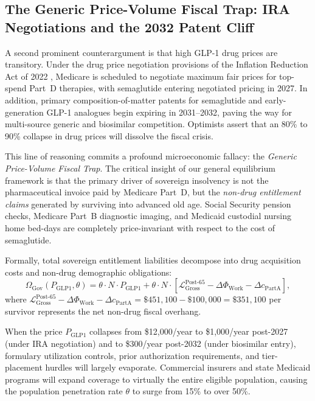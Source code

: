 \documentclass[11pt,a4paper]{article}
\begin{document}
\subsection{The Generic Price-Volume Fiscal Trap: IRA Negotiations and the 2032 Patent Cliff}
A second prominent counterargument is that high GLP-1 drug prices are transitory. Under the drug price negotiation provisions of the Inflation Reduction Act of 2022 \citep{frank2023ira}, Medicare is scheduled to negotiate maximum fair prices for top-spend Part~D therapies, with semaglutide entering negotiated pricing in 2027. In addition, primary composition-of-matter patents for semaglutide and early-generation GLP-1 analogues begin expiring in 2031--2032, paving the way for multi-source generic and biosimilar competition. Optimists assert that an 80\% to 90\% collapse in drug prices will dissolve the fiscal crisis.

This line of reasoning commits a profound microeconomic fallacy: the \textit{Generic Price-Volume Fiscal Trap}. The critical insight of our general equilibrium framework is that the primary driver of sovereign insolvency is not the pharmaceutical invoice paid by Medicare Part~D, but the \textit{non-drug entitlement claims} generated by surviving into advanced old age. Social Security pension checks, Medicare Part~B diagnostic imaging, and Medicaid custodial nursing home bed-days are completely price-invariant with respect to the cost of semaglutide. 

Formally, total sovereign entitlement liabilities decompose into drug acquisition costs and non-drug demographic obligations:
\begin{equation}
    \Omega_{\text{Gov}}(P_{\text{GLP1}}, \theta) = \theta \cdot N \cdot P_{\text{GLP1}} + \theta \cdot N \cdot \left[ \mathcal{L}_{\text{Gross}}^{\text{Post-65}} - \Delta\Phi_{\text{Work}} - \Delta c_{\text{PartA}} \right],
\end{equation}
where $\mathcal{L}_{\text{Gross}}^{\text{Post-65}} - \Delta\Phi_{\text{Work}} - \Delta c_{\text{PartA}} = \$451,100 - \$100,000 = \$351,100$ per survivor represents the net non-drug fiscal overhang. 

When the price $P_{\text{GLP1}}$ collapses from \$12,000/year to \$1,000/year post-2027 (under IRA negotiation) and to \$300/year post-2032 (under biosimilar entry), formulary utilization controls, prior authorization requirements, and tier-placement hurdles will largely evaporate. Commercial insurers and state Medicaid programs will expand coverage to virtually the entire eligible population, causing the population penetration rate $\theta$ to surge from 15\% to over 50\%. 
\end{document}
